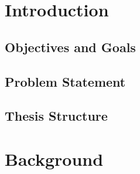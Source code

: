 \documentclass[11pt]{article}
\begin{document}
\section{Introduction}
\subsection{Objectives and Goals}
\subsection{Problem Statement}
\subsection{Thesis Structure}










\section{Background}
\end{document}
